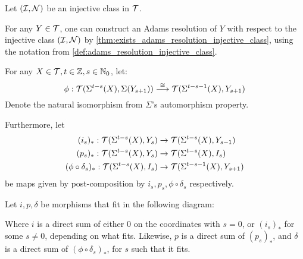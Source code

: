 \begin{construction} \label{construction:adams_spectral_sequence} 
    Let \( ({\mathcal{I}}, {\mathcal{N}}) \) be an injective class in \( {\mathcal{T}} \).

    For any \( Y \in {\mathcal{T}} \), one can construct an Adams resolution of \( Y \) with respect to the injective class \( ({\mathcal{I}}, {\mathcal{N}}) \) by \autoref{thm:exists_adams_resolution_injective_class}, using the notation from \autoref{def:adams_resolution_injective_class}.

    For any \( X \in {\mathcal{T}}, t \in {\mathbb{Z}}, s \in {\mathbb{N}}_0 \), let:
    \[ 
        \phi: {\mathcal{T}}(\Sigma^{t - s}(X), \Sigma(Y_{s + 1})) \stackrel{\cong}{\longrightarrow} {\mathcal{T}}(\Sigma^{t - s - 1}(X), Y_{s + 1}) 
    \]
    Denote the natural isomorphism from \( \Sigma \)'s automorphism property.

    Furthermore, let
    \begin{align*}
        (i_s)_*: {\mathcal{T}}(\Sigma^{t - s}(X), Y_s) &\to {\mathcal{T}}(\Sigma^{t - s}(X), Y_{s - 1}) \\
        (p_s)_*: {\mathcal{T}}(\Sigma^{t - s}(X), Y_s) &\to {\mathcal{T}}(\Sigma^{t - s}(X), I_s) \\
        (\phi \circ \delta_s)_*: {\mathcal{T}}(\Sigma^{t - s}(X), I_s) &\to {\mathcal{T}}(\Sigma^{t - s - 1}(X), Y_{s + 1})
    \end{align*}
    be maps given by post-composition by \( i_s, p_s, \phi \circ \delta_s \) respectively.

    Let \( i, p, \delta \) be morphisms that fit in the following diagram:

    \begin{center}
    \end{center}

    Where \( i \) is a direct sum of either \( 0 \) on the coordinates with \( s = 0 \), or \( (i_s)_* \) for some \( s \neq 0 \), depending on what fits. Likewise, \( p \) is a direct sum of \( (p_s)_* \), and \( \delta \) is a direct sum of \( (\phi \circ \delta_s)_* \), for \( s \) such that it fits.
\end{construction}

